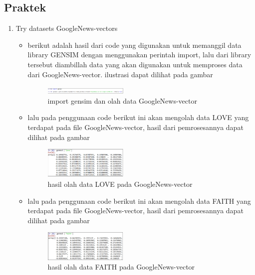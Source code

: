     \subsection{Praktek}
        \begin{enumerate}
        \item Try datasets GoogleNews-vectors
        \begin{itemize}
        \item berikut adalah hasil dari code yang digunakan untuk memanggil data library GENSIM dengan menggunakan perintah import, lalu dari library tersebut diambillah data yang akan digunakan untuk memproses data dari GoogleNews-vector. ilustrasi dapat dilihat pada gambar
        \begin{figure}[H]
            \includegraphics[width=4cm]{figures/1174040/chapter5/1.png}
            \centering
            \caption{import gensim dan olah data GoogleNews-vector}
        \end{figure}
        
        \item lalu pada penggunaan code berikut ini akan mengolah data LOVE yang terdapat pada file GoogleNews-vector, hasil dari pemrosesannya dapat dilihat pada gambar
        \begin{figure}[H]
            \includegraphics[width=4cm]{figures/1174040/chapter5/2.png}
            \centering
            \caption{hasil olah data LOVE pada GoogleNews-vector}
        \end{figure}
        
        \item  lalu pada penggunaan code berikut ini akan mengolah data FAITH yang terdapat pada file GoogleNews-vector, hasil dari pemrosesannya dapat dilihat pada gambar
        \begin{figure}[H]
            \includegraphics[width=4cm]{figures/1174040/chapter5/3.png}
            \centering
            \caption{hasil olah data FAITH pada GoogleNews-vector}
        \end{figure}
        

\end{itemize}
\end{enumerate}
